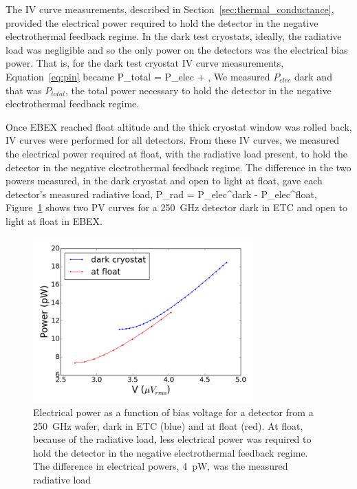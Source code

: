 The IV curve measurements, described in Section~\ref{sec:thermal_conductance}, provided the electrical power required to hold the detector in the negative electrothermal feedback regime. 
In the dark test cryostats, ideally, the radiative load was negligible and so the only power on the detectors was the electrical bias power. 
That is, for the dark test cryostat IV curve measurements, Equation~\ref{eq:pin} became
\be
P_{total} = P_{elec} + ,
\label{eq:total_power_dark}
\ee
We measured $P_{elec}$ dark and that was $P_{total}$, the total power necessary to hold the detector in the negative electrothermal feedback regime. 

Once \ac{EBEX} reached float altitude and the thick cryostat window was rolled back, IV curves were performed for all detectors. 
From these IV curves, we measured the electrical power required at float, with the radiative load present, to hold the detector in the negative electrothermal feedback regime. 
The difference in the two powers measured, in the dark cryostat and open to light at float, gave each detector's measured radiative load,
\be
P_{rad} = P_{elec}^{dark} - P_{elec}^{float},
\label{eq:radiative_load}
\ee
Figure~\ref{fig:dark_light_iv_curves} shows two PV curves for a 250~GHz detector dark in \ac{ETC} and open to light at float in \ac{EBEX}. 

\begin{figure}[htp]
\begin{center}
\includegraphics[height=2.5in]{figures/board64_wire3_ch06_pv_dark_and_float.png}
\caption[PV curves dark in test cryostat and open to light at float]{Electrical power as a function of bias voltage for a detector from a 250~GHz wafer, dark in \ac{ETC} (blue) and at float (red). At float, because of the radiative load, less electrical power was required to hold the detector in the negative electrothermal feedback regime. The difference in electrical powers, 4~pW, was the measured radiative load 
\label{fig:dark_light_iv_curves} }
\end{center}
\end{figure}

